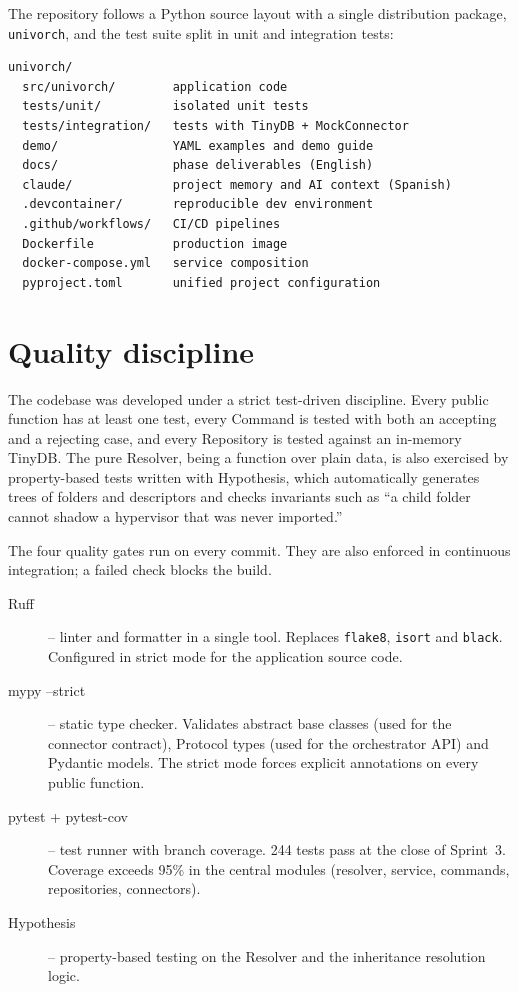 The repository follows a Python source layout with a single
distribution package, \texttt{univorch}, and the test suite split in
unit and integration tests:

\begin{verbatim}
univorch/
  src/univorch/        application code
  tests/unit/          isolated unit tests
  tests/integration/   tests with TinyDB + MockConnector
  demo/                YAML examples and demo guide
  docs/                phase deliverables (English)
  claude/              project memory and AI context (Spanish)
  .devcontainer/       reproducible dev environment
  .github/workflows/   CI/CD pipelines
  Dockerfile           production image
  docker-compose.yml   service composition
  pyproject.toml       unified project configuration
\end{verbatim}

\section{Quality discipline}
\label{sec:calidad}

The codebase was developed under a strict test-driven discipline.
Every public function has at least one test, every Command is tested
with both an accepting and a rejecting case, and every Repository is
tested against an in-memory TinyDB. The pure Resolver, being a
function over plain data, is also exercised by property-based tests
written with Hypothesis, which automatically
generates trees of folders and descriptors and checks invariants
such as ``a child folder cannot shadow a hypervisor that was never
imported.''

The four quality gates run on every commit. They are also enforced
in continuous integration; a failed check blocks the build.

\begin{description}
  \item[Ruff] -- linter and formatter in a single
        tool. Replaces \texttt{flake8}, \texttt{isort} and
        \texttt{black}. Configured in strict mode for the application
        source code.
  \item[mypy --strict] -- static type checker. Validates abstract
        base classes (used for the connector contract), Protocol
        types (used for the orchestrator API) and Pydantic models.
        The strict mode forces explicit annotations on every public
        function.
  \item[pytest + pytest-cov] -- test runner with branch coverage.
        244 tests pass at the close of Sprint~3. Coverage exceeds
        95\% in the central modules (resolver, service, commands,
        repositories, connectors).
  \item[Hypothesis] -- property-based testing on the Resolver and
        the inheritance resolution logic.
\end{description}

